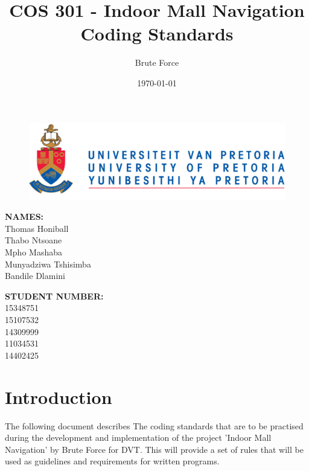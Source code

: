 \documentclass{article}
\title{COS 301 - Indoor Mall Navigation Coding Standards}
\author{Brute Force}
\date{\today}
\begin{document}
	\maketitle
	
	\begin{figure}[!t]
		\includegraphics{up_logo.png}
	\end{figure}
	\begin{minipage}{0.4\textwidth}
		\begin{flushleft} \large
			\textbf{NAMES:}\\[0.4cm]
			Thomas Honiball\\
			Thabo Ntsoane\\
			Mpho Mashaba\\	
			Munyadziwa Tshisimba\\
			Bandile Dlamini

		\end{flushleft}
	\end{minipage}
	\begin{minipage}{0.4\textwidth}
		\begin{flushright} \large
			\textbf{STUDENT NUMBER:} \\[0.4cm]
		 	15348751\\ 	
		 	15107532\\		
		 	14309999\\		
		 	11034531\\	
		 	14402425
		\end{flushright}
	\end{minipage}

\maketitle

\pagebreak

\pagebreak
\tableofcontents
\pagebreak

\section{Introduction}

The following document describes The coding standards that are to be practised during the development and implementation of the project 'Indoor Mall Navigation' by Brute Force for DVT.
\newline
\newline
This will provide a set of rules that will be used as guidelines and requirements for written programs.
\end{document}
